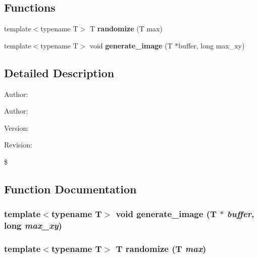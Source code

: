 \subsection*{Functions}
\begin{CompactItemize}
\item 
template$<$typename T$>$ T {\bf randomize} (T max)
\item 
template$<$typename T$>$ void {\bf generate\_\-image} (T $\ast$buffer, long max\_\-xy)
\end{CompactItemize}


\subsection{Detailed Description}
\begin{Desc}
\item[Author: ]\par
\end{Desc}
\begin{Desc}
\item[Author: ]\par
 \end{Desc}
 \begin{Desc}
\item[Version: ]\par
\end{Desc}
\begin{Desc}
\item[Revision: ]\par
 \end{Desc}
 \$ 



\subsection{Function Documentation}
\subsubsection{\setlength{\rightskip}{0pt plus 5cm}template$<$typename T$>$ void generate\_\-image (T $\ast$ {\em buffer}, long {\em max\_\-xy})}\label{namespaceTangoTest_a1}


\subsubsection{\setlength{\rightskip}{0pt plus 5cm}template$<$typename T$>$ T randomize (T {\em max})\hspace{0.3cm}{\tt  [inline]}}\label{namespaceTangoTest_a0}


